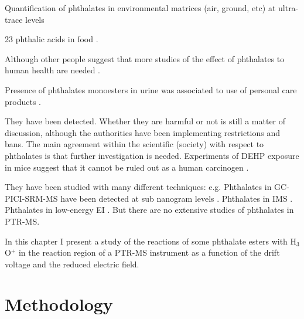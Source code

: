 Quantification of phthalates in environmental matrices (air, ground, etc) at ultra-trace levels \cite{net2015reliable}

23 phthalic acids in food \cite{xu2014determination}.



Although other people suggest that more studies of the effect of phthalates to human health are needed \cite{hauser2005phthalates}.

 
 
Presence of phthalates monoesters in urine was associated to use of personal care products \cite{duty2005personal}.

They have been detected. Whether they are harmful or not  is still a matter of discussion, although the authorities have been implementing restrictions and bans. The main agreement within the scientific (society) with respect to phthalates is that further investigation is needed.
%
Experiments of  DEHP exposure  in mice suggest that it cannot be ruled out as a human carcinogen \cite{rusyn2012mechanistic}.

They have been studied with many different techniques:
e.g.
Phthalates in GC-PICI-SRM-MS have been detected at sub nanogram levels \cite{GC-PICI-phthalates}.
%
Phthalates in IMS \cite{michalczuk2019isomer}.
%
Phthalates in low-energy EI \cite{lacko2018dissociation}.
%
But there are no extensive studies of phthalates in PTR-MS. 



In this chapter I present a study of the reactions of some phthalate esters with H$_3$O$^+$ in the reaction region of a PTR-MS instrument as a function of the drift voltage and the reduced electric field.




\section{Methodology}

